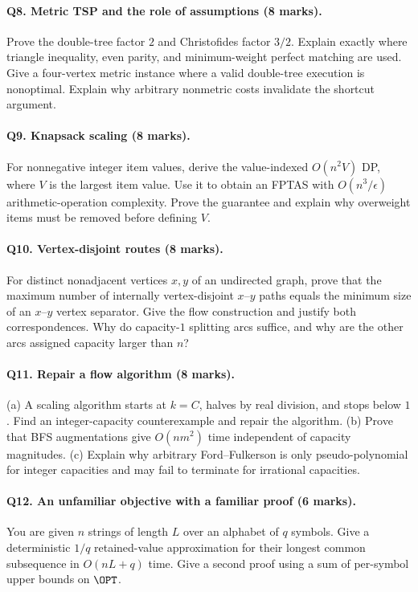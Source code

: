 \paragraph{Q8. Metric TSP and the role of assumptions (8 marks).}
Prove the double-tree factor $2$ and Christofides factor $3/2$.  Explain
exactly where triangle inequality, even parity, and minimum-weight perfect
matching are used.  Give a four-vertex metric instance where a valid
double-tree execution is nonoptimal.  Explain why arbitrary nonmetric
costs invalidate the shortcut argument.

\paragraph{Q9. Knapsack scaling (8 marks).}
For nonnegative integer item values, derive the value-indexed $O(n^2V)$ DP,
where $V$ is the largest item value.  Use it to obtain an FPTAS with
$O(n^3/\epsilon)$ arithmetic-operation complexity.  Prove the guarantee
and explain why overweight items must be removed before defining $V$.

\paragraph{Q10. Vertex-disjoint routes (8 marks).}
For distinct nonadjacent vertices $x,y$ of an undirected graph, prove that
the maximum number of internally vertex-disjoint $x$--$y$ paths equals
the minimum size of an $x$--$y$ vertex separator.  Give the flow construction
and justify both correspondences.  Why do capacity-$1$ splitting arcs
suffice, and why are the other arcs assigned capacity larger than $n$?

\paragraph{Q11. Repair a flow algorithm (8 marks).}
(a) A scaling algorithm starts at $k=C$, halves by real division, and stops
below $1$.  Find an integer-capacity counterexample and repair the algorithm.
(b) Prove that BFS augmentations give $O(nm^2)$ time independent of capacity
magnitudes.  (c) Explain why arbitrary Ford--Fulkerson is only
pseudo-polynomial for integer capacities and may fail to terminate for
irrational capacities.

\paragraph{Q12. An unfamiliar objective with a familiar proof (6 marks).}
You are given $n$ strings of length $L$ over an alphabet of $q$ symbols.
Give a deterministic $1/q$ retained-value approximation for their longest
common subsequence in $O(nL+q)$ time.  Give a second proof using a sum of
per-symbol upper bounds on $\OPT$.

